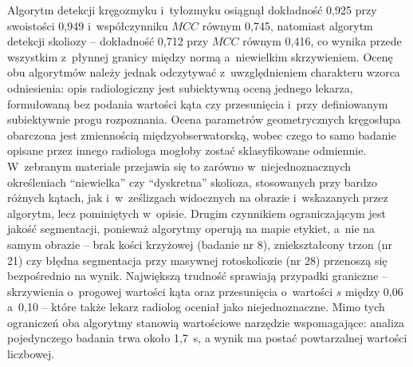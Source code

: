 Algorytm detekcji kręgozmyku i~tyłozmyku osiągnął dokładność 0,925 przy swoistości 0,949 i~współczynniku $MCC$ równym 0,745, natomiast algorytm detekcji skoliozy -- dokładność 0,712 przy $MCC$ równym 0,416, co wynika przede wszystkim z~płynnej granicy między normą a~niewielkim skrzywieniem.
Ocenę obu algorytmów należy jednak odczytywać z~uwzględnieniem charakteru wzorca odniesienia: opis radiologiczny jest subiektywną oceną jednego lekarza, formułowaną bez podania wartości kąta czy przesunięcia i~przy definiowanym subiektywnie progu rozpoznania.
Ocena parametrów geometrycznych kręgosłupa obarczona jest zmiennością międzyobserwatorską, wobec czego to samo badanie opisane przez innego radiologa mogłoby zostać sklasyfikowane odmiennie.
W~zebranym materiale przejawia się to zarówno w~niejednoznacznych określeniach \enquote{niewielka} czy \enquote{dyskretna} skolioza, stosowanych przy bardzo różnych kątach, jak i~w~ześlizgach widocznych na obrazie i~wskazanych przez algorytm, lecz pominiętych w~opisie.
Drugim czynnikiem ograniczającym jest jakość segmentacji, ponieważ algorytmy operują na mapie etykiet, a~nie na samym obrazie -- brak kości krzyżowej (badanie nr 8), zniekształcony trzon (nr 21) czy błędna segmentacja przy masywnej rotoskoliozie (nr 28) przenoszą się bezpośrednio na wynik.
Największą trudność sprawiają przypadki graniczne -- skrzywienia o~progowej wartości kąta oraz przesunięcia o~wartości $s$ między 0,06 a~0,10 -- które także lekarz radiolog  oceniał jako niejednoznaczne.
Mimo tych ograniczeń oba algorytmy stanowią wartościowe narzędzie wspomagające: analiza pojedynczego badania trwa około 1,7~s,  a wynik ma postać powtarzalnej wartości liczbowej.
